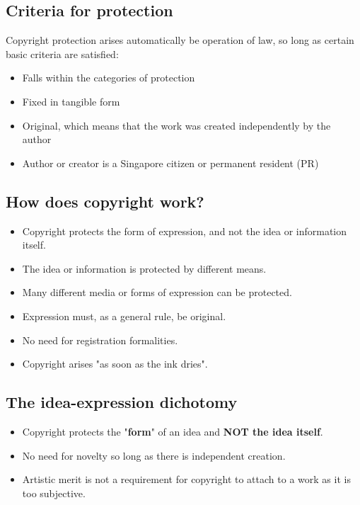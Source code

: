 \documentclass[11pt]{article}
\begin{document}
\subsection{Criteria for protection}
\label{sec:org1180acf}
Copyright protection arises automatically be operation of law, so long as certain basic criteria are satisfied:
\begin{itemize}
\item Falls within the categories of protection
\item Fixed in tangible form
\item Original, which means that the work was created independently by the author
\item Author or creator is a Singapore citizen or permanent resident (PR)
\end{itemize}
\subsection{How does copyright work?}
\label{sec:org5e3008f}
\begin{itemize}
\item Copyright protects the form of expression, and not the idea or information itself.
\item The idea or information is protected by different means.
\item Many different media or forms of expression can be protected.
\item Expression must, as a general rule, be original.
\item No need for registration formalities.
\item Copyright arises "as soon as the ink dries".
\end{itemize}
\subsection{The idea-expression dichotomy}
\label{sec:org246f892}
\begin{itemize}
\item Copyright protects the "\textbf{form}" of an idea and \textbf{NOT the idea itself}.
\item No need for novelty so long as there is independent creation.
\item Artistic merit is not a requirement for copyright to attach to a work as it is too subjective.
\end{itemize}

\clearpage
\end{document}

